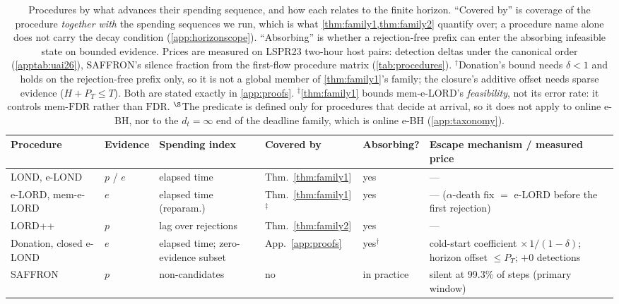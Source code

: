 \documentclass[conference]{IEEEtran}
\newcommand{\FDR}{\mathrm{FDR}}
\begin{document}
\begin{table}[t]
\centering
\caption{Procedures by what advances their spending sequence, and how each relates to the finite
horizon. ``Covered by'' is coverage of the procedure \emph{together with} the spending sequences we run,
which is what \cref{thm:family1,thm:family2} quantify over; a procedure name alone does not carry the
decay condition (\cref{app:horizonscope}). ``Absorbing'' is whether a rejection-free prefix can enter
the absorbing infeasible state on bounded evidence. Prices are measured on LSPR23 two-hour host pairs: detection deltas under the canonical
order (\cref{apptab:uai26}), SAFFRON's silence fraction from the first-flow procedure matrix
(\cref{tab:procedures}). $^{\dagger}$Donation's bound needs $\delta<1$ and holds on the
rejection-free prefix only, so it is not a global member of \cref{thm:family1}'s family; the closure's
additive offset needs sparse evidence ($H+P_T\le T$). Both are stated exactly in \cref{app:proofs}.
$^{\ddagger}$\cref{thm:family1} bounds mem-e-LORD's \emph{feasibility}, not its error rate: it controls
mem-$\FDR$ rather than $\FDR$. $^{\S}$The predicate is defined only for procedures that decide at
arrival, so it does not apply to online e-BH, nor to the $d_t=\infty$ end of the deadline family, which
is online e-BH (\cref{app:taxonomy}).}
\label{tab:taxonomy}
\footnotesize
\setlength{\tabcolsep}{4pt}
\begin{tabular}{@{}l l p{2.3cm} l l p{4.7cm}@{}}
\toprule
Procedure & Evidence & Spending index & Covered by & Absorbing? & Escape mechanism / measured price \\
\midrule
LOND, e-LOND~\cite{javanmard2015lond,xu2024elond} & $p$ / $e$ & elapsed time & Thm.~\ref{thm:family1} & yes & --- \\
e-LORD, mem-e-LORD~\cite{egai2025} & $e$ & elapsed time (reparam.) & Thm.~\ref{thm:family1}$^{\ddagger}$ & yes & --- ($\alpha$-death fix $=$ e-LORD before the first rejection) \\
LORD++~\cite{ramdas2017lordpp} & $p$ & lag over rejections & Thm.~\ref{thm:family2} & yes & --- \\
Donation, closed e-LOND~\cite{xu2026eclosure,xu2025closure} & $e$ & elapsed time; zero-evidence subset & App.~\ref{app:proofs} & yes$^{\dagger}$ & cold-start coefficient $\times\,1/(1-\delta)$; horizon offset $\le P_T$; $+0$ detections \\
SAFFRON~\cite{ramdas2018saffron} & $p$ & non-candidates & no & in practice & silent at 99.3\% of steps (primary window) \\

\end{tabular}
\end{table}
\end{document}

